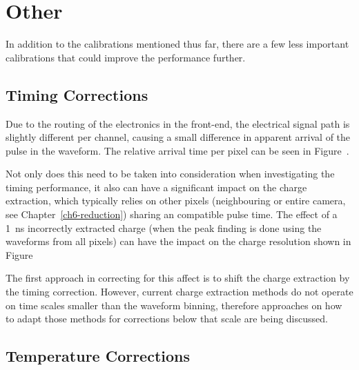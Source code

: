 
\section{Other}

In addition to the calibrations mentioned thus far, there are a few less important calibrations that could improve the performance further. 

\subsection{Timing Corrections}

Due to the routing of the electronics in the front-end, the electrical signal path is slightly different per channel, causing a small difference in apparent arrival of the pulse in the waveform. The relative arrival time per pixel can be seen in Figure~. 

Not only does this need to be taken into consideration when investigating the timing performance, it also can have a significant impact on the charge extraction, which typically relies on other pixels (neighbouring or entire camera, see Chapter~\ref{ch6-reduction}) sharing an compatible pulse time. The effect of a 1~ns incorrectly extracted charge (when the peak finding is done using the waveforms from all pixels) can have the impact on the charge resolution shown in Figure~

The first approach in correcting for this affect is to shift the charge extraction by the timing correction. However, current charge extraction methods do not operate on time scales smaller than the waveform binning, therefore approaches on how to adapt those methods for corrections below that scale are being discussed.

\subsection{\label{temperature_corrections}Temperature Corrections}

